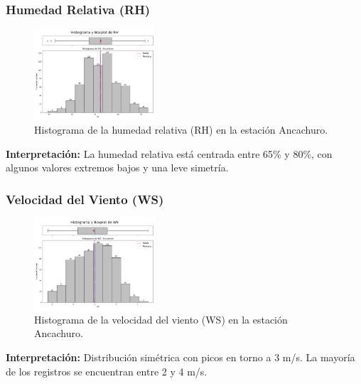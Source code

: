 \subsubsection*{Humedad Relativa (RH)}
\begin{figure}[H]
\centering
\includegraphics[width=0.4\textwidth]{resultados/por_estacion_meteorologica/Ancachuro/RH_histograma.png}
\caption{Histograma de la humedad relativa (RH) en la estación Ancachuro.}
\label{fig:ancachuro_RH}
\end{figure}
\textbf{Interpretación:} La humedad relativa está centrada entre 65\% y 80\%, con algunos valores extremos bajos y una leve simetría.

\subsubsection*{Velocidad del Viento (WS)}
\begin{figure}[H]
\centering
\includegraphics[width=0.4\textwidth]{resultados/por_estacion_meteorologica/Ancachuro/WS_histograma.png}
\caption{Histograma de la velocidad del viento (WS) en la estación Ancachuro.}
\label{fig:ancachuro_WS}
\end{figure}
\textbf{Interpretación:} Distribución simétrica con picos en torno a 3 m/s. La mayoría de los registros se encuentran entre 2 y 4 m/s.

